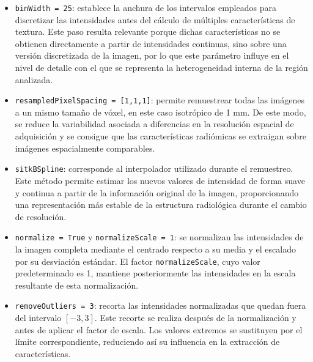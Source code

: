 \begin{itemize}
    \item \texttt{binWidth = 25}: establece la anchura de los intervalos empleados para discretizar las intensidades antes del cálculo de múltiples características de textura. Este paso resulta relevante porque dichas características no se obtienen directamente a partir de intensidades continuas, sino sobre una versión discretizada de la imagen, por lo que este parámetro influye en el nivel de detalle con el que se representa la heterogeneidad interna de la región analizada.

    \item \texttt{resampledPixelSpacing = [1,1,1]}: permite remuestrear todas las imágenes a un mismo tamaño de vóxel, en este caso isotrópico de 1 mm. De este modo, se reduce la variabilidad asociada a diferencias en la resolución espacial de adquisición y se consigue que las características radiómicas se extraigan sobre imágenes espacialmente comparables.

    \item \texttt{sitkBSpline}: corresponde al interpolador utilizado durante el remuestreo. Este método permite estimar los nuevos valores de intensidad de forma suave y continua a partir de la información original de la imagen, proporcionando una representación más estable de la estructura radiológica durante el cambio de resolución.


    \item \texttt{normalize = True} y \texttt{normalizeScale = 1}: se normalizan las intensidades de la imagen completa mediante el centrado respecto a su media y el escalado por su desviación estándar. El factor \texttt{normalizeScale}, cuyo valor predeterminado es 1, mantiene posteriormente las intensidades en la escala resultante de esta normalización.

    \item \texttt{removeOutliers = 3}: recorta las intensidades normalizadas que quedan fuera del intervalo $[-3,3]$. Este recorte se realiza después de la normalización y antes de aplicar el factor de escala. Los valores extremos se sustituyen por el límite correspondiente, reduciendo así su influencia en la extracción de características.

\end{itemize}


